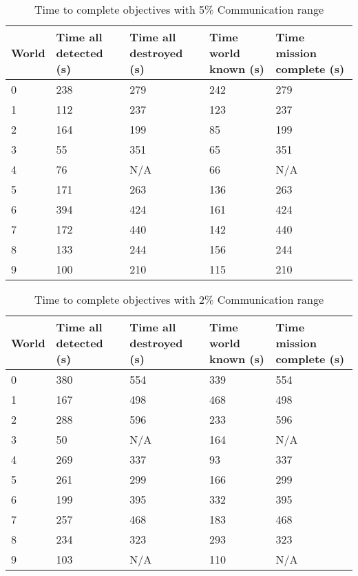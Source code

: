 \begin{table}[H]
	\caption{Time to complete objectives with 5\% Communication range}
	\centering
	\label{tab:comm5}
	
	\begin{tabular}{|p{1cm}|p{1.5cm}|p{1.75cm}|p{1.5cm}|p{1.5cm}|}
		\hline
		World & Time all detected (s) & Time all destroyed (s) & Time world known (s) & Time mission complete (s) \\
		\hline
		0&238&279&242&279 \\ \hline
		1&112&237&123&237 \\ \hline
		2&164&199&85&199 \\ \hline
		3&55&351&65&351 \\ \hline
		4&76& N/A &66& N/A\\ \hline
		5&171&263&136&263 \\ \hline
		6&394&424&161&424 \\ \hline
		7&172&440&142&440 \\ \hline
		8&133&244&156&244 \\ \hline
		9&100&210&115&210 \\ \hline
	\end{tabular}
\end{table}


\begin{table}[H]
	\caption{Time to complete objectives with 2\% Communication range}
	\centering
	\label{tab:comm2}
	
	\begin{tabular}{|p{1cm}|p{1.5cm}|p{1.75cm}|p{1.5cm}|p{1.5cm}|}
		\hline
		World & Time all detected (s) & Time all destroyed (s) & Time world known (s) & Time mission complete (s) \\
		\hline
		0&380&554&339&554 \\ \hline
		1&167&498&468&498 \\ \hline
		2&288&596&233&596 \\ \hline
		3&50& N/A &164& N/A\\ \hline
		4&269&337&93&337 \\ \hline
		5&261&299&166&299 \\ \hline
		6&199&395&332&395 \\ \hline
		7&257&468&183&468 \\ \hline
		8&234&323&293&323 \\ \hline
		9&103& N/A &110& N/A\\ \hline
	\end{tabular}
\end{table}

